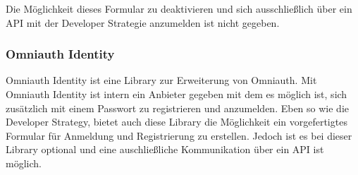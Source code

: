 \documentclass[11pt]{article}
\begin{document}
\begin{flushleft}
			Die Möglichkeit dieses Formular zu deaktivieren und sich ausschließlich über ein API mit der Developer Strategie anzumelden ist nicht gegeben.\par\bigskip
			
			
			\subsubsection{Omniauth Identity}
			\label{sec: omniauth_identity}
			Omniauth Identity ist eine Library zur Erweiterung von Omniauth. Mit Omniauth Identity ist intern ein Anbieter gegeben mit dem es möglich ist, sich zusätzlich mit einem Passwort zu registrieren und anzumelden. Eben so wie die Developer Strategy, bietet auch diese Library die Möglichkeit ein vorgefertigtes Formular für Anmeldung und Registrierung zu erstellen. Jedoch ist es bei dieser Library optional und eine auschließliche Kommunikation über ein API ist möglich.\par\bigskip
			
			
			
		\end{flushleft}
	
	
\end{document}
